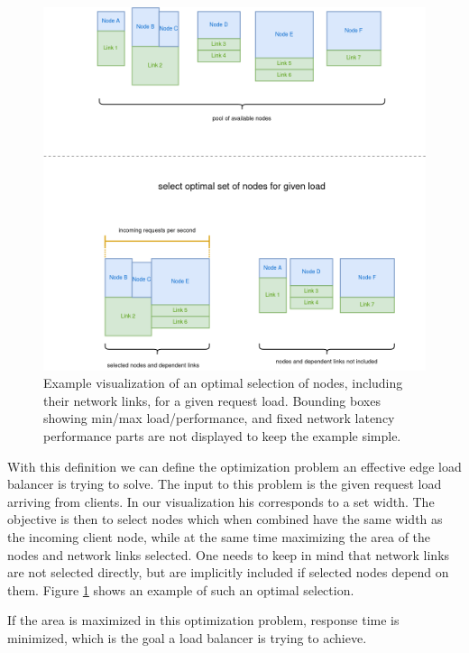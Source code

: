 \documentclass[draft,final]{vutinfth} %
\begin{document}
\begin{figure}
    \centering
    \includegraphics[width=14cm]{graphics/diagrams/lb_optimal_selection.png}
    \caption{Example visualization of an optimal selection of nodes, including their network links, for a given request load. Bounding boxes showing min/max load/performance, and fixed network latency performance parts are not displayed to keep the example simple.}
    \label{fig:lb_optimal_load}
\end{figure}

With this definition we can define the optimization problem an effective edge load balancer is trying to solve. The input to this problem is the given request load arriving from clients. In our visualization his corresponds to a set width. The objective is then to select nodes which when combined have the same width as the incoming client node, while at the same time maximizing the area of the nodes and network links selected. One needs to keep in mind that network links are not selected directly, but are implicitly included if selected nodes depend on them. Figure \ref{fig:lb_optimal_load} shows an example of such an optimal selection.

If the area is maximized in this optimization problem, response time is minimized, which is the goal a load balancer is trying to achieve.
\end{document}
